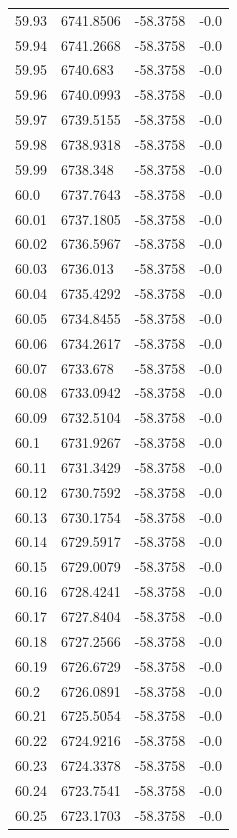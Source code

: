 \begin{table}[H]
\begin{tabular}{llll}
59.93 & 6741.8506 & -58.3758 & -0.0 \\
59.94 & 6741.2668 & -58.3758 & -0.0 \\
59.95 & 6740.683 & -58.3758 & -0.0 \\
59.96 & 6740.0993 & -58.3758 & -0.0 \\
59.97 & 6739.5155 & -58.3758 & -0.0 \\
59.98 & 6738.9318 & -58.3758 & -0.0 \\
59.99 & 6738.348 & -58.3758 & -0.0 \\
60.0 & 6737.7643 & -58.3758 & -0.0 \\
60.01 & 6737.1805 & -58.3758 & -0.0 \\
60.02 & 6736.5967 & -58.3758 & -0.0 \\
60.03 & 6736.013 & -58.3758 & -0.0 \\
60.04 & 6735.4292 & -58.3758 & -0.0 \\
60.05 & 6734.8455 & -58.3758 & -0.0 \\
60.06 & 6734.2617 & -58.3758 & -0.0 \\
60.07 & 6733.678 & -58.3758 & -0.0 \\
60.08 & 6733.0942 & -58.3758 & -0.0 \\
60.09 & 6732.5104 & -58.3758 & -0.0 \\
60.1 & 6731.9267 & -58.3758 & -0.0 \\
60.11 & 6731.3429 & -58.3758 & -0.0 \\
60.12 & 6730.7592 & -58.3758 & -0.0 \\
60.13 & 6730.1754 & -58.3758 & -0.0 \\
60.14 & 6729.5917 & -58.3758 & -0.0 \\
60.15 & 6729.0079 & -58.3758 & -0.0 \\
60.16 & 6728.4241 & -58.3758 & -0.0 \\
60.17 & 6727.8404 & -58.3758 & -0.0 \\
60.18 & 6727.2566 & -58.3758 & -0.0 \\
60.19 & 6726.6729 & -58.3758 & -0.0 \\
60.2 & 6726.0891 & -58.3758 & -0.0 \\
60.21 & 6725.5054 & -58.3758 & -0.0 \\
60.22 & 6724.9216 & -58.3758 & -0.0 \\
60.23 & 6724.3378 & -58.3758 & -0.0 \\
60.24 & 6723.7541 & -58.3758 & -0.0 \\
60.25 & 6723.1703 & -58.3758 & -0.0 \\

\end{tabular}
\end{table}
